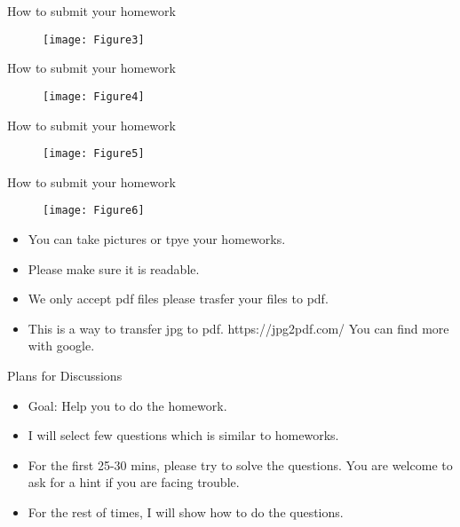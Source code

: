 \documentclass{beamer}
\begin{document}
\begin{frame}{How to submit your homework}
\begin{figure}
	\centering
	\texttt{[image: Figure3]}
\end{figure}
\end{frame}
\begin{frame}{How to submit your homework}
	\begin{figure}
		\centering
		\texttt{[image: Figure4]}
	\end{figure}
\end{frame}
\begin{frame}{How to submit your homework}
	\begin{figure}
		\centering
		\texttt{[image: Figure5]}
	\end{figure}
\end{frame}
\begin{frame}{How to submit your homework}
	\begin{figure}
		\centering
		\texttt{[image: Figure6]}
	\end{figure}

\end{frame}
\begin{frame}
	\begin{itemize}
	\item You can take pictures or tpye your homeworks. 
	\item Please make sure it is readable. 
	\item We only accept pdf files please trasfer  your files to pdf.
	\item This is a way to transfer jpg to pdf. 
	https://jpg2pdf.com/ 
	You can find more with google.
	\end{itemize}
\end{frame}
\begin{frame}{Plans for Discussions}
\begin{itemize}
\item Goal: Help you to do the homework.
\item I will select few questions which is similar to homeworks.
\item For the first 25-30 mins, please try to solve the questions.
You are welcome to ask for a hint if you are facing trouble.
\item For the rest of times, I will show how to do the questions.
\end{itemize}
\end{frame}
\end{document}
